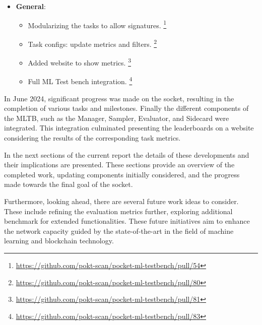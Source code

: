 \begin{itemize}[noitemsep]
\begin{itemize}[noitemsep]
\begin{itemize}[noitemsep]
                \item Added endpoint for tokenizer in llm nodes. \footnote{\url{https://github.com/pokt-scan/pocket-ml-testbench/pull/56}}                
            \end{itemize}
        \item \textbf{General}:
            \begin{itemize}[noitemsep]
                \item Modularizing the tasks to allow signatures. \footnote{\url{https://github.com/pokt-scan/pocket-ml-testbench/pull/54}}
                \item Task configs: update metrics and filters. \footnote{\url{https://github.com/pokt-scan/pocket-ml-testbench/pull/80}}
                \item Added website to show metrics. \footnote{\url{https://github.com/pokt-scan/pocket-ml-testbench/pull/81}}
                \item Full ML Test bench integration. \footnote{\url{https://github.com/pokt-scan/pocket-ml-testbench/pull/83}}            
            \end{itemize}
    \end{itemize}
\end{itemize}

In June 2024, significant progress was made on the socket, resulting in the completion of various tasks and milestones. 
Finally the different components of the \gls{MLTB}, such as the Manager, Sampler, Evaluator, and Sidecard were integrated. 
This integration culminated presenting the leaderboards on a website considering the results of the corresponding task metrics.

In the next sections of the current report the details of these developments and their implications are presented. 
These sections provide an overview of the completed work, updating components initially considered, and the progress made towards the final goal of the socket.

Furthermore, looking ahead, there are several future work ideas to consider. 
These include refining the evaluation metrics further, exploring additional benchmark for extended functionalities. 
These future initiatives aim to enhance the network capacity guided by the state-of-the-art in the field of machine learning and blockchain technology.


